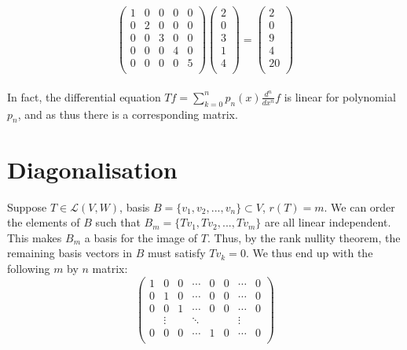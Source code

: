 \documentclass{article}
\begin{document}
\begin{equation*}
	\left(
	\begin{matrix}
		1 & 0 & 0 & 0 & 0 \\
		0 & 2 & 0 & 0 & 0 \\
		0 & 0 & 3 & 0 & 0 \\
		0 & 0 & 0 & 4 & 0 \\
		0 & 0 & 0 & 0 & 5 \\
	\end{matrix}
	\right)
	\left(
	\begin{matrix}
		2 \\
		0 \\
		3 \\
		1 \\
		4 \\
	\end{matrix}
	\right) = \left(
	\begin{matrix}
		2 \\
		0 \\
		9 \\
		4 \\
		20 \\
	\end{matrix}
	\right)
\end{equation*}
\\
In fact, the differential equation $Tf=\sum_{k=0}^np_n(x)\frac{d^n}{dx^n}f$ is linear for polynomial $p_n$, and as thus there is a corresponding matrix.

\section{Diagonalisation}
Suppose $T \in \mathcal{L}(V, W)$, basis $B=\{v_1,v_2,...,v_n\}\subset V$, $r(T)=m$. We can order the elements of $B$ such that $B_m=\{Tv_1,Tv_2,...,Tv_m\}$ are all linear independent. This makes $B_m$ a basis for the image of $T$. Thus, by the rank nullity theorem, the remaining basis vectors in $B$ must satisfy $Tv_k=0$. We thus end up with the following $m$ by $n$ matrix:
\begin{equation*}
\left(
	\begin{matrix}
		1 & 0 & 0 & \cdots & 0 & 0 & \cdots & 0 \\
		0 & 1 & 0 & \cdots & 0 & 0 & \cdots &  0 \\
		0 & 0 & 1 & \cdots & 0 & 0 & \cdots &  0 \\
		& \vdots & & \ddots & & & \vdots \\
		0 & 0 & 0 & \cdots & 1 & 0 & \cdots &  0 \\
	\end{matrix}
\right)
\end{equation*}
\end{document}
